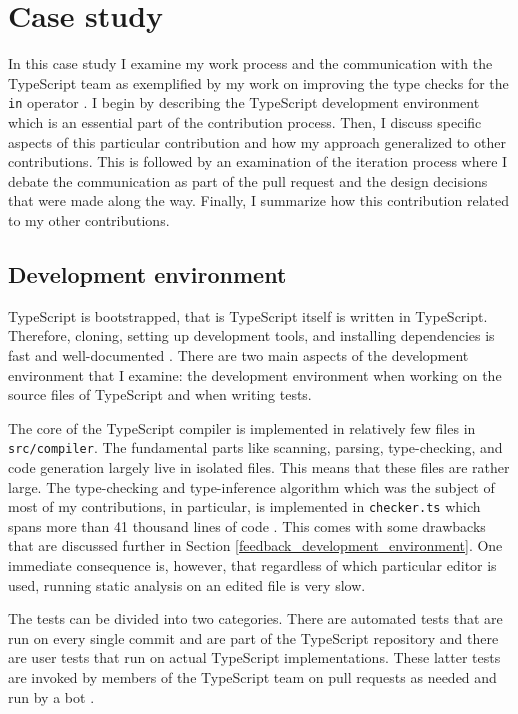 \documentclass[12pt]{scrartcl}
\def\code#1{\texttt{\frenchspacing#1}}
\let\oldsection\section
\renewcommand\section{\clearpage\oldsection}
\begin{document}
\section{Case study}
\label{case_study}

In this case study I examine my work process and the communication with the TypeScript team as exemplified by my work on improving the type checks for the \code{in} operator \cite{41317}. I begin by describing the TypeScript development environment which is an essential part of the contribution process. Then, I discuss specific aspects of this particular contribution and how my approach generalized to other contributions. This is followed by an examination of the iteration process where I debate the communication as part of the pull request and the design decisions that were made along the way. Finally, I summarize how this contribution related to my other contributions.

\subsection{Development environment}

TypeScript is bootstrapped, that is TypeScript itself is written in TypeScript. Therefore, cloning, setting up development tools, and installing dependencies is fast and well-documented \cite{ContributingGuidelines}. There are two main aspects of the development environment that I examine: the development environment when working on the source files of TypeScript and when writing tests.

The core of the TypeScript compiler is implemented in relatively few files in \break\code{src/compiler}. The fundamental parts like scanning, parsing, type-checking, and code generation largely live in isolated files. This means that these files are rather large. The type-checking and type-inference algorithm which was the subject of most of my contributions, in particular, is implemented in \code{checker.ts} which spans more than 41 thousand lines of code \cite{CheckerFile}. This comes with some drawbacks that are discussed further in Section \ref{feedback_development_environment}. One immediate consequence is, however, that regardless of which particular editor is used, running static analysis on an edited file is very slow.

The tests can be divided into two categories. There are automated tests that are run on every single commit and are part of the TypeScript repository \cite{ContributingGuidelines} and there are user tests that run on actual TypeScript implementations. These latter tests are invoked by members of the TypeScript team on pull requests as needed and run by a bot \cite{UserTests}.
\end{document}
